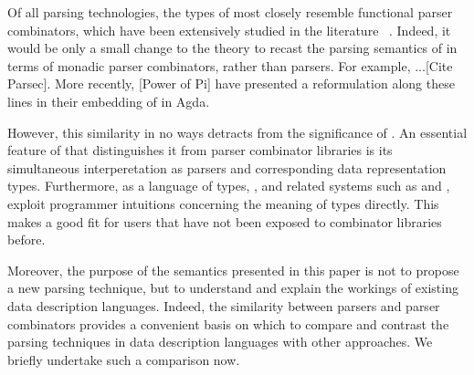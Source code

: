 Of all parsing technologies, the types of \ddc{} most closely resemble functional parser combinators, which have been extensively studied in the literature ~\cite{burge:parser-combinators,hutton+:parser-combinators}. Indeed, it would be only a small change to the \ddc{} theory to recast the parsing semantics of \ddc{} in terms of monadic parser combinators, rather than parsers. For example, ...[Cite Parsec]. More recently, [Power of Pi] have presented a reformulation along these lines in their embedding of \ddc{} in Agda.

However, this similarity in no ways detracts from the significance of \ddc{}. An essential feature of \ddc{} that distinguishes it from parser combinator libraries is its simultaneous interperetation as parsers and corresponding data representation types. Furthermore, as a language of types,
\ddc{}, and related systems such as \pads{} and \packettypes, exploit
programmer intuitions concerning the meaning of types directly.  
This makes \pads{} a good fit for users that have not been exposed to
combinator libraries before.

Moreover, the purpose of the semantics presented in this paper is not to propose a new parsing technique, but to understand and explain the workings of existing data description languages. Indeed, the similarity between \ddc{} parsers and parser combinators provides a convenient basis on which to compare and contrast the parsing techniques in data description languages with other approaches. We briefly undertake such a comparison now.

